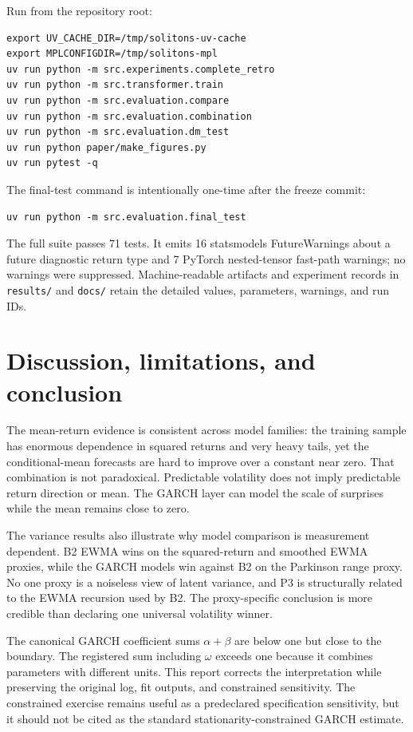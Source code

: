 \documentclass[11pt,a4paper]{article}
\begin{document}
Run from the repository root:
\begin{lstlisting}
export UV_CACHE_DIR=/tmp/solitons-uv-cache
export MPLCONFIGDIR=/tmp/solitons-mpl
uv run python -m src.experiments.complete_retro
uv run python -m src.transformer.train
uv run python -m src.evaluation.compare
uv run python -m src.evaluation.combination
uv run python -m src.evaluation.dm_test
uv run python paper/make_figures.py
uv run pytest -q
\end{lstlisting}
The final-test command is intentionally one-time after the freeze commit:
\begin{lstlisting}
uv run python -m src.evaluation.final_test
\end{lstlisting}
The full suite passes 71 tests. It emits 16 statsmodels FutureWarnings about a future diagnostic
return type and 7 PyTorch nested-tensor fast-path warnings; no warnings were suppressed.
Machine-readable artifacts and experiment records in \texttt{results/} and \texttt{docs/} retain
the detailed values, parameters, warnings, and run IDs.

\section{Discussion, limitations, and conclusion}
The mean-return evidence is consistent across model families: the training sample has enormous
dependence in squared returns and very heavy tails, yet the conditional-mean forecasts are hard to
improve over a constant near zero. That combination is not paradoxical. Predictable volatility
does not imply predictable return direction or mean. The GARCH layer can model the scale of
surprises while the mean remains close to zero.

The variance results also illustrate why model comparison is measurement dependent. B2 EWMA
wins on the squared-return and smoothed EWMA proxies, while the GARCH models win against B2 on
the Parkinson range proxy. No one proxy is a noiseless view of latent variance, and P3 is
structurally related to the EWMA recursion used by B2. The proxy-specific conclusion is more
credible than declaring one universal volatility winner.

The canonical GARCH coefficient sums $\alpha+\beta$ are below one but close to the boundary.
The registered sum including $\omega$ exceeds one because it combines parameters with different
units. This report corrects the interpretation while preserving the original log, fit outputs,
and constrained sensitivity. The constrained exercise remains useful as a predeclared
specification sensitivity, but it should not be cited as the standard stationarity-constrained
GARCH estimate.
\end{document}
